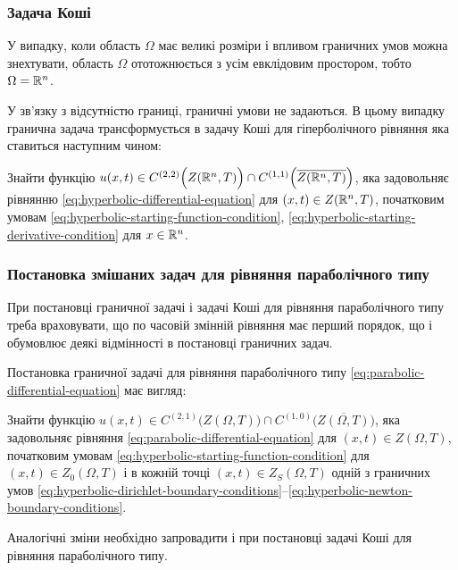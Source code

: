 \subsubsection{Задача Коші}

У випадку, коли область $\Omega$ має великі розміри і впливом граничних умов можна знехтувати, область $\Omega$ ототожнюється з усім евклідовим простором, тобто $\Omega = \mathbb{R}^n$. \medskip

У зв'язку з відсутністю границі, граничні умови не задаються. В цьому випадку гранична задача трансформується в задачу Коші для гіперболічного рівняння яка ставиться наступним чином: 
\begin{problem_formulation*}
    Знайти функцію $u(x, t) \in C^{(2, 2)} \Big( Z(\mathbb{R}^n, T) \Big) \cap C^{(1, 1)} \Big( \overline {Z(\mathbb{R}^n, T)} \Big)$, яка задовольняє рівнянню \eqref{eq:hyperbolic-differential-equation} для $(x, t) \in Z(\mathbb{R}^n, T)$, початковим умовам \eqref{eq:hyperbolic-starting-function-condition}, \eqref{eq:hyperbolic-starting-derivative-condition} для $x \in \mathbb{R}^n$.
\end{problem_formulation*}

\subsubsection{Постановка змішаних задач для рівняння параболічного типу}

При постановці граничної задачі і задачі Коші для рівняння параболічного типу треба враховувати, що по часовій змінній рівняння має перший порядок, що і обумовлює деякі відмінності в постановці граничних задач. \medskip

Постановка граничної задачі для рівняння параболічного типу \eqref{eq:parabolic-differential-equation} має вигляд:
\begin{problem_formulation*}
    Знайти функцію $u(x, t) \in C^{(2, 1)} \Big( Z(\Omega, T) \Big) \cap C^{(1, 0)} \Big( \overline {Z(\Omega, T)} \Big)$, яка задовольняє рівняння \eqref{eq:parabolic-differential-equation} для $(x, t) \in Z(\Omega, T)$, початковим умовам \eqref{eq:hyperbolic-starting-function-condition} для $(x, t) \in Z_0(\Omega, T)$ і в кожній точці $(x, t) \in Z_S(\Omega, T)$ одній з граничних умов \eqref{eq:hyperbolic-dirichlet-boundary-conditions}--\eqref{eq:hyperbolic-newton-boundary-conditions}.
\end{problem_formulation*}

Аналогічні зміни необхідно запровадити і при постановці задачі Коші для рівняння параболічного типу.

